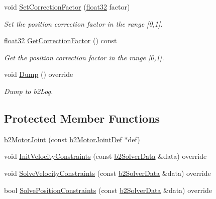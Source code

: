 \begin{DoxyCompactItemize}
void \mbox{\hyperlink{classb2_motor_joint_ae59e624b8a7b6f869ab5e6148352cb52}{Set\+Correction\+Factor}} (\mbox{\hyperlink{b2_settings_8h_aacdc525d6f7bddb3ae95d5c311bd06a1}{float32}} factor)
\begin{DoxyCompactList}\small\item\em Set the position correction factor in the range \mbox{[}0,1\mbox{]}. \end{DoxyCompactList}\item 
\mbox{\hyperlink{b2_settings_8h_aacdc525d6f7bddb3ae95d5c311bd06a1}{float32}} \mbox{\hyperlink{classb2_motor_joint_a429f9656d9f39e6e992de59c9620d6c6}{Get\+Correction\+Factor}} () const
\begin{DoxyCompactList}\small\item\em Get the position correction factor in the range \mbox{[}0,1\mbox{]}. \end{DoxyCompactList}\item 
void \mbox{\hyperlink{classb2_motor_joint_abb67754f39b4747ae07af5cb5b348836}{Dump}} () override
\begin{DoxyCompactList}\small\item\em Dump to b2\+Log. \end{DoxyCompactList}\end{DoxyCompactItemize}
\subsection*{Protected Member Functions}
\begin{DoxyCompactItemize}
\item 
\mbox{\hyperlink{classb2_motor_joint_ac0c56b069910915e1ceef3b89c035833}{b2\+Motor\+Joint}} (const \mbox{\hyperlink{structb2_motor_joint_def}{b2\+Motor\+Joint\+Def}} $\ast$def)
\item 
void \mbox{\hyperlink{classb2_motor_joint_aeffac9d1e3940c362962319d1bdb3f22}{Init\+Velocity\+Constraints}} (const \mbox{\hyperlink{structb2_solver_data}{b2\+Solver\+Data}} \&data) override
\item 
void \mbox{\hyperlink{classb2_motor_joint_a620c75b301aeab409f9d50a041a80fb8}{Solve\+Velocity\+Constraints}} (const \mbox{\hyperlink{structb2_solver_data}{b2\+Solver\+Data}} \&data) override
\item 
bool \mbox{\hyperlink{classb2_motor_joint_a4e56455ab7e90f82fc1f463efc9b59de}{Solve\+Position\+Constraints}} (const \mbox{\hyperlink{structb2_solver_data}{b2\+Solver\+Data}} \&data) override
\end{DoxyCompactItemize}
